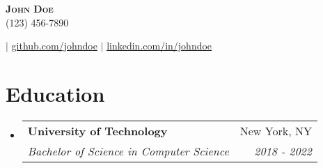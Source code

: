 \documentclass[letterpaper,11pt]{article}
\makeatletter
\newcommand{\resumeSubheading}[4]{
  \vspace{-2pt}\item
    \begin{tabular*}{0.97\textwidth}[t]{l@{\extracolsep{\fill}}r}
      \textbf{#1} & #2 \\
      \textit{\small#3} & \textit{\small #4} \\
    \end{tabular*}\vspace{-7pt}
}
\newcommand{\resumeSubHeadingListStart}{\begin{itemize}[leftmargin=0.15in, label={}]}
\newcommand{\resumeSubHeadingListEnd}{\end{itemize}}
\makeatother
\begin{document}
\begin{center}
    \textbf{\Huge \scshape John Doe} \\ \vspace{1pt}
    \small 
    (123) 456-7890
    
    
     $|$ 
    \href{https://github.com/johndoe}{\underline{github.com/johndoe}}
     $|$ 
    \href{https://linkedin.com/in/johndoe}{\underline{linkedin.com/in/johndoe}}
\end{center}

\section{Education}
    \resumeSubHeadingListStart
        \resumeSubheading
            { University of Technology }{ New York, NY }
            { Bachelor of Science in Computer Science }{ 2018 - 2022 }
    \resumeSubHeadingListEnd

\end{document}
